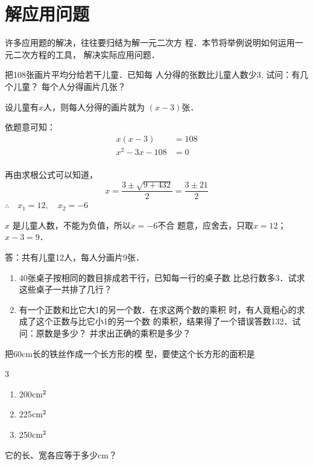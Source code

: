 \begin{enumerate}
\end{enumerate}


\section{解应用问题}
许多应用题的解决，往往要归结为解一元二次方
程．本节将举例说明如何运用一元二次方程的工具，
解决实际应用问题．

\begin{example}
把108张画片平均分给若干儿童．已知每
人分得的张数比儿童人数少3, 试问：有几个儿童？
每个人分得画片几张？
\end{example}

\begin{solution}
    设儿童有$x$人，则每人分得的画片就为
$(x-3)$张．

依题意可知：\[\begin{split}
    x(x-3)&=108\\
x^2-3x-108&=0\\
\end{split}\]

再由求根公式可以知道，
\[x=\frac{3\pm\sqrt{9+432}}{2}=\frac{3\pm 21}{2}  \]
$\therefore\quad x_1=12,\quad x_2=-6$

$x$
是儿童人数，不能为负值，所以$x=-6$不合
题意，应舍去，只取$x=12$； $x-3=9$．

答：共有儿童12人，每人分画片9张．
\end{solution}

\begin{ex}
\begin{enumerate}
    \item 40张桌子按相同的数目排成若干行，已知每一行的桌子数
    比总行数多3．试求这些桌子一共排了几行？
    \item 有一个正数和比它大1的另一个数．在求这两个数的乘积
    时，有人竟粗心的求成了这个正数与比它小1的另一个数
    的乘积，结果得了一个错误答数132．试问：原数是多少？
    并求出正确的乘积是多少？
\end{enumerate}
\end{ex}

\begin{example}
    把60cm长的铁丝作成一个长方形的模
    型，要使这个长方形的面积是
    \begin{multicols}{3}
        \begin{enumerate}
        \item 200${\rm cm}^2$
        \item 225${\rm cm}^2$
        \item 250${\rm cm}^2$
    \end{enumerate}        
    \end{multicols}
        
它的长、宽各应等于多少cm？
\end{example}


